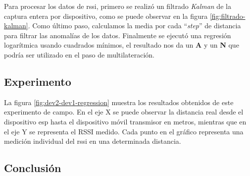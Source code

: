 Para procesar los datos de \acs{rssi}, primero se realizó un filtrado \textit{Kalman} de la captura entera por dispositivo, como se puede observar en la figura \ref{fig:filtrado-kalman}. Como último paso, calculamos la media por cada “\textit{step}” de distancia para filtrar las anomalías de los datos. Finalmente se ejecutó una regresión logarítmica usando cuadrados mínimos, el resultado nos da un \textbf{A} y un \textbf{N} que podría ser utilizado en el paso de multilateración.

\subsection{Experimento}

La figura \ref{fig:dev2-dev1-regression} muestra los resultados obtenidos de este experimento de campo. En el eje X se puede observar la distancia real desde el dispositivo \acs{esp} hasta el dispositivo móvil transmisor en metros, mientras que en el eje Y se representa el RSSI medido. Cada punto en el gráfico representa una medición individual del \acs{rssi} en una determinada distancia.



\subsection{Conclusión}

